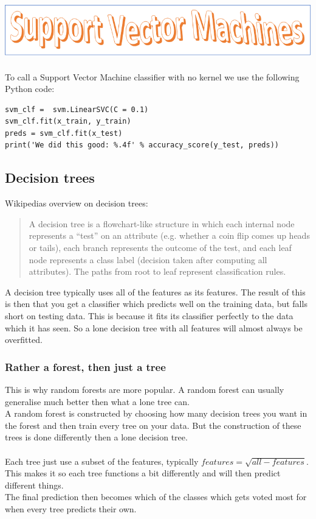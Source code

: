 \documentclass[parskip=half]{scrartcl}
\theoremstyle{definition}
\theoremstyle{remark}
\begin{document}
\subsection{\protect\includegraphics{svmheading.png}}

To call a Support Vector Machine classifier with no kernel we use the following Python code:
\begin{verbatim}
svm_clf =  svm.LinearSVC(C = 0.1)
svm_clf.fit(x_train, y_train)
preds = svm_clf.fit(x_test)
print('We did this good: %.4f' % accuracy_score(y_test, preds))
\end{verbatim}

\subsection{Decision trees}
Wikipedias overview on decision trees:
\begin{quotation}
	A decision tree is a flowchart-like structure in which each internal node represents a ``test'' on an attribute (e.g. whether a coin flip comes up heads or tails), each branch represents the outcome of the test, and each leaf node represents a class label (decision taken after computing all attributes). The paths from root to leaf represent classification rules.
\end{quotation}
A decision tree typically uses all of the features as its features. The result of this is then that you get a classifier which predicts well on the training data, but falls short on testing data. This is because it fits its classifier perfectly to the data which it has seen. So a lone decision tree with all features will almost always be overfitted.
\subsubsection{Rather a forest, then just a tree}
This is why random forests are more popular. A random forest can usually generalise much better then what a lone tree can.\\
A random forest is constructed by choosing how many decision trees you want in the forest and then train every tree on your data. But the construction of these trees is done differently then a lone decision tree.\\
\\
Each tree just use a subset of the features, typically $ features = \sqrt{all-features}$. This makes it so each tree functions a bit differently and will then predict different things.\\
The final prediction then becomes which of the classes which gets voted most for when every tree predicts their own.
\end{document}
